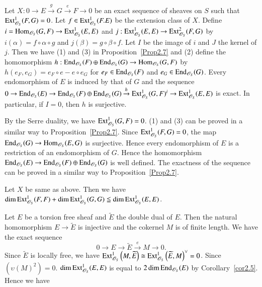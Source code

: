 \begin{Prop}\label{Prop2.10}
Let $X:0\to E\xrightarrow{g} G\xrightarrow{e}F\to 0$ be an exact
sequence of sheaves on $S$ such that
$\mathrm{Ext}^{1}_{\mathscr{O}_S}(F,G)=0$. Let
$f \in \mathrm{Ext}^{1}_{\mathscr{O}_S}(F.E)$ be the extension class of
$X$. Define
$i=\mathrm{Hom}_{\mathscr{O}_S}(G,F)\to \mathrm{Ext}^{1}_{\mathscr{O}_S}(E,E)$ and
$j:\mathrm{Ext}^{1}_{\mathscr{O}_S}(E,E)\to \mathrm{Ext}^{2}_{\mathscr{O}_S}(F,G)$ by
$i(\alpha)=f\circ \alpha \circ g$ and $j(\beta)=g\circ \beta \circ
f$. Let $I$ be the image of $i$ and $J$ the kernel of $j$. Then we
have (1) and (3) in Proposition~\ref{Prop2.7} and (2) define the
homomorphism $h:\mathrm{End}_{\mathscr{O}_S}(F)\oplus
\mathrm{End}_{\mathscr{O}_S}(G)\to \mathrm{Hom}_{\mathscr{O}_S}(G,F)$ by
$h(e_F,e_G)=e_F\circ e-e\circ e_G$ for $e_F\in \mathrm{End}_{\mathscr{O}_S}(F)$
and $e_G\in \mathrm{End}_{\mathscr{O}_S}(G)$. Every endomorphism of $E$ is
induced by that of $G$ and the sequence $0\to
\mathrm{End}_{\mathscr{O}_S}(E)\to \mathrm{End}_{\mathscr{O}_S}(F)\oplus
\mathrm{End}_{\mathscr{O}_S}(G)\xrightarrow{h} \mathrm{Ext}^{1}_{\mathscr{O}_S}(G,F)^{i}\to \mathrm{Ext}^{1}_{\mathscr{O}_S}(E,E)$\pageoriginale
is exact. In particular, if $I=0$, then $h$ is surjective.
\end{Prop}

\begin{Proof}
By the Serre duality, we have $\mathrm{Ext}^{1}_{\mathscr{O}_S}(G,F)=0$. (1)
and (3) can be proved in a similar way to Proposition~\ref{Prop2.7}.
Since $\mathrm{Ext}^{1}_{\mathscr{O}_S}(F,G)=0$, the map
$\mathrm{End}_{\mathscr{O}_S}(G)\to \mathrm{Hom}_{\mathscr{O}_S}(E,G)$ is
surjective. Hence every endomorphism of $E$ is a restriction of an
endomorphism of $G$. Hence the homomorphism $\mathrm{End}_{\mathscr{O}_S}(E)\to
\mathrm{End}_{\mathscr{O}_S}(F)\oplus \mathrm{End}_{\mathscr{O}_S}(G)$  is well
defined. The exactness of the sequence can be proved in a similar way
to Proposition~\ref{Prop2.7}.
\enprf
\end{Proof}

\begin{cor}\label{cor2.11}
Let $X$ be same as above. Then we have
$\dim \mathrm{Ext}^{1}_{\mathscr{O}_S}(F,F)\\+\dim \mathrm{Ext}^{1}_{\mathscr{O}_S}(G,G)\leqq
\dim \mathrm{Ext}^{1}_{\mathscr{O}_S}(E,E)$. 
\end{cor}

Let $E$ be a torsion free sheaf and $\widetilde{E}$ the double dual of
$E$. Then the natural homomorphism $E\to \widetilde{E}$ is injective
and the cokernel $M$ is of finite length. We have the exact sequence 
$$
0\to E\to \widetilde{E}\xrightarrow{e} M\to 0.
$$
Since $\widetilde{E}$ is locally free, we have
$\mathrm{Ext}^{1}_{\mathscr{O}_S}\left(M,\widetilde{E}\right)\cong \mathrm{Ext}^{1}_{\mathscr{O}_S}\left(\widetilde{E},
M\right)^{\vee}=0$. Since
$\left(\upsilon(M)^{2}\right)=0$. $\dim \mathrm{Ext}^{1}_{\mathscr{O}_S}(E,E)$ is
equal to $2 \dim \mathrm{End}_{\mathscr{O}_S}(E)$  by
Corollary~\ref{cor2.5}. Hence we have 

